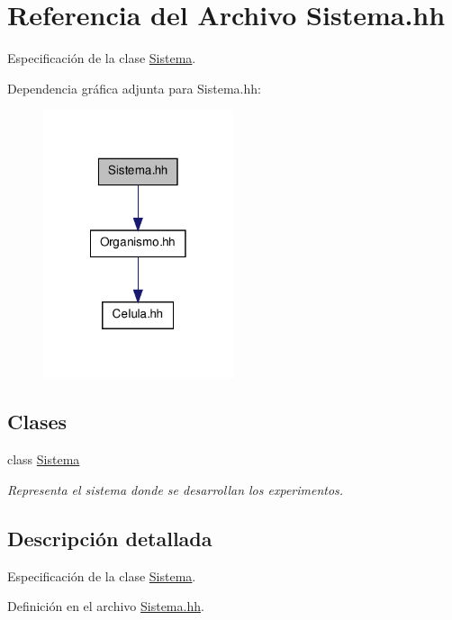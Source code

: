 \hypertarget{_sistema_8hh}{\section{\-Referencia del \-Archivo \-Sistema.\-hh}
\label{_sistema_8hh}
}


\-Especificación de la clase \hyperlink{class_sistema}{\-Sistema}.  


\-Dependencia gráfica adjunta para \-Sistema.\-hh\-:
\nopagebreak
\begin{figure}[H]
\begin{center}
\leavevmode
\includegraphics[width=158pt]{_sistema_8hh__incl}
\end{center}
\end{figure}
\subsection*{\-Clases}
\begin{DoxyCompactItemize}
\item 
class \hyperlink{class_sistema}{\-Sistema}
\begin{DoxyCompactList}\small\item\em \-Representa el sistema donde se desarrollan los experimentos. \end{DoxyCompactList}\end{DoxyCompactItemize}


\subsection{\-Descripción detallada}
\-Especificación de la clase \hyperlink{class_sistema}{\-Sistema}. 

\-Definición en el archivo \hyperlink{_sistema_8hh_source}{\-Sistema.\-hh}.

